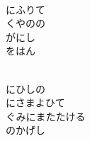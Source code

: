 \documentclass[10pt,b5j]{tarticle} %
\begin{document}
\begin{enumerate}
\begin{minipage}[c]{\blocksize}
    \end{minipage}
    \begin{minipage}[c]{\blocksize}
        
        \vspace{\linespace}
        \item~\\
        にふりて\\
        くやのの\\
        がにし\\
        をはん
        
    \end{minipage}
    \begin{minipage}[c]{\blocksize}
        
        \vspace{\linespace}
        \item~\\
        にひしの\\
        にさまよひて\\
        ぐみにまたたける\\
        のかげし
    
    \end{minipage}
\end{enumerate} %
\end{document}
